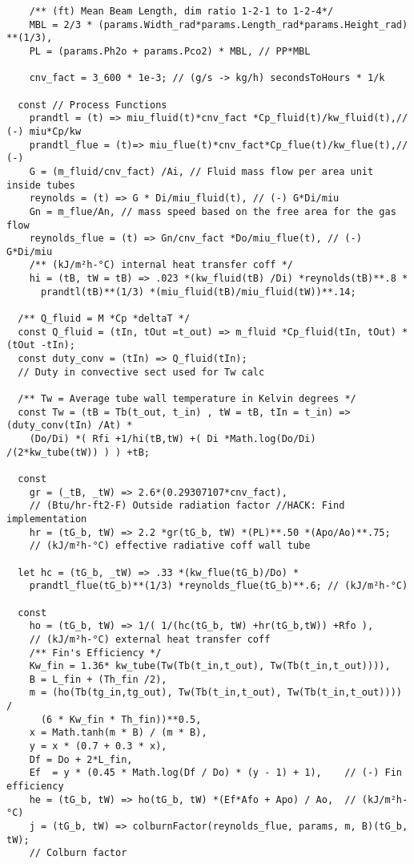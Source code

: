 \begin{verbatim}
    /** (ft) Mean Beam Length, dim ratio 1-2-1 to 1-2-4*/
    MBL = 2/3 * (params.Width_rad*params.Length_rad*params.Height_rad) **(1/3),
    PL = (params.Ph2o + params.Pco2) * MBL, // PP*MBL

    cnv_fact = 3_600 * 1e-3; // (g/s -> kg/h) secondsToHours * 1/k

  const // Process Functions
    prandtl = (t) => miu_fluid(t)*cnv_fact *Cp_fluid(t)/kw_fluid(t),// (-) miu*Cp/kw
    prandtl_flue = (t)=> miu_flue(t)*cnv_fact*Cp_flue(t)/kw_flue(t),// (-)
    G = (m_fluid/cnv_fact) /Ai, // Fluid mass flow per area unit inside tubes
    reynolds = (t) => G * Di/miu_fluid(t), // (-) G*Di/miu
    Gn = m_flue/An, // mass speed based on the free area for the gas flow
    reynolds_flue = (t) => Gn/cnv_fact *Do/miu_flue(t), // (-) G*Di/miu
    /** (kJ/m²h-°C) internal heat transfer coff */
    hi = (tB, tW = tB) => .023 *(kw_fluid(tB) /Di) *reynolds(tB)**.8 *
      prandtl(tB)**(1/3) *(miu_fluid(tB)/miu_fluid(tW))**.14;

  /** Q_fluid = M *Cp *deltaT */
  const Q_fluid = (tIn, tOut =t_out) => m_fluid *Cp_fluid(tIn, tOut) *(tOut -tIn);
  const duty_conv = (tIn) => Q_fluid(tIn);  
  // Duty in convective sect used for Tw calc

  /** Tw = Average tube wall temperature in Kelvin degrees */
  const Tw = (tB = Tb(t_out, t_in) , tW = tB, tIn = t_in) => (duty_conv(tIn) /At) *
    (Do/Di) *( Rfi +1/hi(tB,tW) +( Di *Math.log(Do/Di) /(2*kw_tube(tW)) ) ) +tB;

  const
    gr = (_tB, _tW) => 2.6*(0.29307107*cnv_fact), 
    // (Btu/hr-ft2-F) Outside radiation factor //HACK: Find implementation
    hr = (tG_b, tW) => 2.2 *gr(tG_b, tW) *(PL)**.50 *(Apo/Ao)**.75; 
    // (kJ/m²h-°C) effective radiative coff wall tube

  let hc = (tG_b, _tW) => .33 *(kw_flue(tG_b)/Do) *
    prandtl_flue(tG_b)**(1/3) *reynolds_flue(tG_b)**.6; // (kJ/m²h-°C)

  const
    ho = (tG_b, tW) => 1/( 1/(hc(tG_b, tW) +hr(tG_b,tW)) +Rfo ), 
    // (kJ/m²h-°C) external heat transfer coff
    /** Fin's Efficiency */
    Kw_fin = 1.36* kw_tube(Tw(Tb(t_in,t_out), Tw(Tb(t_in,t_out)))),
    B = L_fin + (Th_fin /2),
    m = (ho(Tb(tg_in,tg_out), Tw(Tb(t_in,t_out), Tw(Tb(t_in,t_out)))) / 
      (6 * Kw_fin * Th_fin))**0.5,
    x = Math.tanh(m * B) / (m * B),
    y = x * (0.7 + 0.3 * x),
    Df = Do + 2*L_fin,
    Ef  = y * (0.45 * Math.log(Df / Do) * (y - 1) + 1),    // (-) Fin efficiency
    he = (tG_b, tW) => ho(tG_b, tW) *(Ef*Afo + Apo) / Ao,  // (kJ/m²h-°C)
    j = (tG_b, tW) => colburnFactor(reynolds_flue, params, m, B)(tG_b, tW);  
    // Colburn factor


\end{verbatim}
